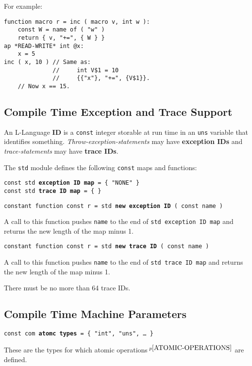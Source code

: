 \documentclass[12pt]{article}
\newcommand{\key}[1]{{\rm \bfseries #1}}
\newcommand{\ttkey}[1]{{\tt \bfseries #1}}
\newcommand{\skey}[2]{{\rm \bfseries #1#2}}
\newcommand{\pagnote}[1]{$\,^{p\pageref{#1}}$}
\newenvironment{indpar}[1][0.3in]%
	{\begin{list}{}%
		     {\setlength{\itemsep}{0in}%
		      \setlength{\topsep}{0in}%
		      \setlength{\parsep}{1ex}%
		      \setlength{\labelwidth}{#1}%
		      \setlength{\leftmargin}{#1}%
		      \addtolength{\leftmargin}{\labelsep}}%
	 \item}%
	{\end{list}}
\begin{document}
For example:
\begin{indpar}[1em]\begin{verbatim}
function macro r = inc ( macro v, int w ):
    const W = name of ( "w" )
    return { v, "+=", { W } }
ap *READ-WRITE* int @x:
    x = 5
inc ( x, 10 ) // Same as:
              //     int V$1 = 10
              //     {{"x"}, "+=", {V$1}}.
    // Now x == 15.
\end{verbatim}\end{indpar}

\subsection{Compile Time Exception and Trace Support}
\label{COMPILE-TIME-EXCEPTION-AND-TRACE-SUPPORT}

An L-Language \key{ID} is a {\tt const} integer storable
at run time in an {\tt uns} variable that identifies something.
{\em Throw-exception-statements} may have \skey{exception ID}s
and {\em trace-statements} may have \skey{trace ID}s.

The {\tt std} module defines the following {\tt const} maps and functions:

{\tt const std \ttkey{exception ID map} = \{ "NONE" \} } \\
{\tt const std \ttkey{trace ID map} = \{ \}}

{\tt constant function const r = std \ttkey{new exception ID} ( const name ) }%
\label{NEW-EXCEPTION-ID}
\begin{indpar}
A call to this function pushes {\tt name} to the end of
{\tt std exception ID map} and returns the new length of the map minus 1.
\end{indpar}

{\tt constant function const r = std \ttkey{new trace ID} ( const name ) }%
\label{NEW-TRACE-ID}
\begin{indpar}
A call to this function pushes {\tt name} to the end of
{\tt std trace ID map} and returns the new length of the map minus 1.

There must be no more than 64 trace IDs.

\end{indpar}


\subsection{Compile Time Machine Parameters}

{\tt const com \ttkey{atomc types} = \{ "int", "uns", \ldots{} \}}%
\label{ATOMIC-TYPES}
\begin{indpar}
These are the types for which atomic operations\pagnote{ATOMIC-OPERATIONS}
are defined.
\end{indpar}
\end{document}
